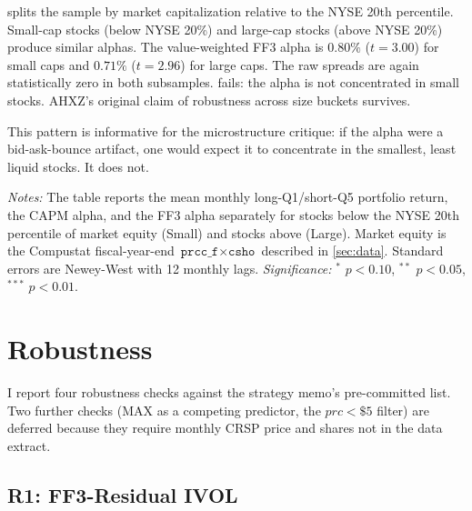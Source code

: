 \documentclass[12pt]{article}
\newcommand{\1}[1]{\mathds{1}\left[#1\right]}
\begin{document}
 splits the sample by market capitalization relative to the
NYSE 20th percentile. Small-cap stocks (below NYSE 20\%) and large-cap stocks
(above NYSE 20\%) produce similar alphas. The value-weighted FF3 alpha is
$0.80\%$ ($t=3.00$) for small caps and $0.71\%$ ($t=2.96$) for large caps.
The raw spreads are again statistically zero in both subsamples. 
fails: the alpha is not concentrated in small stocks. AHXZ's original claim
of robustness across size buckets survives.

This pattern is informative for the \citet{han2011investor} microstructure
critique: if the alpha were a bid-ask-bounce artifact, one would expect it
to concentrate in the smallest, least liquid stocks. It does not.

\begin{table}[H]
\centering
\begin{threeparttable}
\caption{Size heterogeneity: NYSE 20\% split}\label{tab:size}
\small

\begin{tablenotes}\small
\item \textit{Notes:} The table reports the mean monthly long-Q1/short-Q5
portfolio return, the CAPM alpha, and the FF3 alpha separately for stocks
below the NYSE 20th percentile of market equity (Small) and stocks above
(Large). Market equity is the Compustat fiscal-year-end
$\texttt{prcc\_f} \times \texttt{csho}$ described in \cref{sec:data}.
Standard errors are Newey-West with 12 monthly lags. \emph{Significance:}
$^{*}$ $p<0.10$, $^{**}$ $p<0.05$, $^{***}$ $p<0.01$.
\end{tablenotes}
\end{threeparttable}
\end{table}

\section{Robustness}\label{sec:robustness}

I report four robustness checks against the strategy memo's pre-committed
list. Two further checks (MAX as a competing predictor, the $prc<\$5$ filter)
are deferred because they require monthly CRSP price and shares not in the
data extract.

\subsection{R1: FF3-Residual IVOL}
\end{document}
